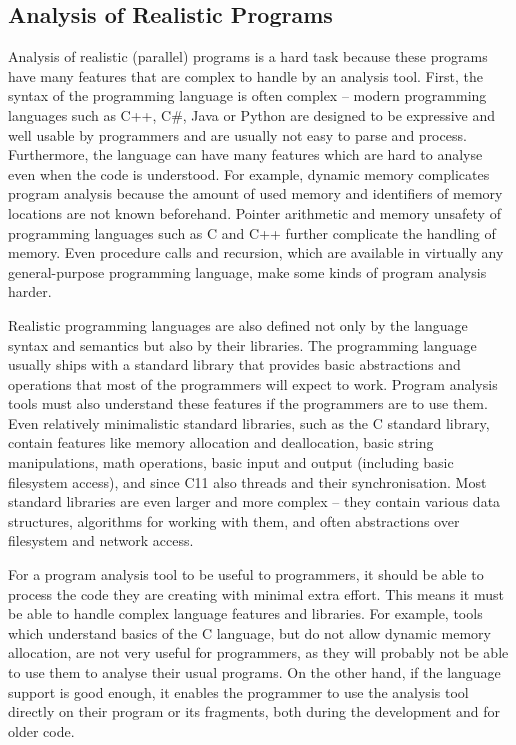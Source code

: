 \subsection{Analysis of Realistic Programs}\label{sec:intro:programs}

Analysis of realistic (parallel) programs is a hard task because these programs have many features that are complex to handle by an analysis tool.
First, the syntax of the programming language is often complex -- modern programming languages such as C++, C\#, Java or Python are designed to be expressive and well usable by programmers and are usually not easy to parse and process.
Furthermore, the language can have many features which are hard to analyse even when the code is understood.
For example, dynamic memory complicates program analysis because the amount of used memory and identifiers of memory locations are not known beforehand.
Pointer arithmetic and memory unsafety of programming languages such as C and C++ further complicate the handling of memory.
Even procedure calls and recursion, which are available in virtually any general-purpose programming language, make some kinds of program analysis harder.

Realistic programming languages are also defined not only by the language syntax and semantics but also by their libraries.
The programming language usually ships with a standard library that provides basic abstractions and operations that most of the programmers will expect to work.
Program analysis tools must also understand these features if the programmers are to use them.
Even relatively minimalistic standard libraries, such as the C standard library, contain features like memory allocation and deallocation, basic string manipulations, math operations, basic input and output (including basic filesystem access), and since C11 also threads and their synchronisation.
Most standard libraries are even larger and more complex -- they contain various data structures, algorithms for working with them, and often abstractions over filesystem and network access.

For a program analysis tool to be useful to programmers, it should be able to process the code they are creating with minimal extra effort.
This means it must be able to handle complex language features and libraries.
For example, tools which understand basics of the C language, but do not allow dynamic memory allocation, are not very useful for programmers, as they will probably not be able to use them to analyse their usual programs.
On the other hand, if the language support is good enough, it enables the programmer to use the analysis tool directly on their program or its fragments, both during the development and for older code.

